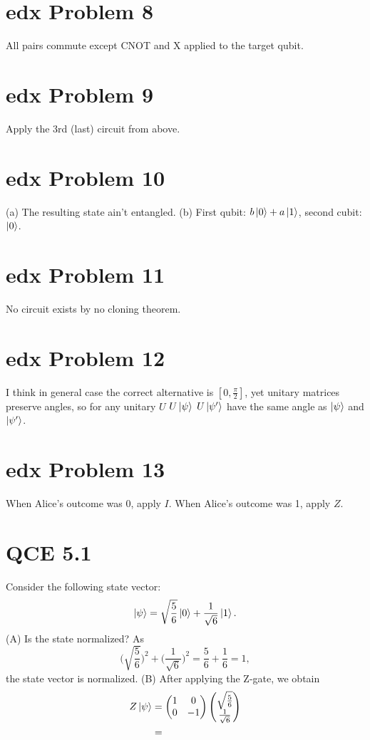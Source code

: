 \documentclass[10pt]{article}
\begin{document}
\section*{edx Problem 8}
All pairs commute except CNOT and X applied to the target qubit.

\section*{edx Problem 9}
Apply the 3rd (last) circuit from above.

\section*{edx Problem 10}
(a) The resulting state ain't entangled.
(b) First qubit: $b\ket{0} + a\ket{1}$, second cubit: $\ket{0}$.

\section*{edx Problem 11}
No circuit exists by no cloning theorem.

\section*{edx Problem 12}
I think in general case the correct alternative is $[0, \frac{\pi}{2}]$, yet unitary matrices preserve angles, so for any unitary $U$ $U\ket{\psi}$ $U\ket{\psi'}$ have the same angle as $\ket{\psi}$ and $\ket{\psi'}$.

\section*{edx Problem 13}
When Alice's outcome was 0, apply $I$. When Alice's outcome was 1, apply $Z$.

\section*{QCE 5.1}
Consider the following state vector:
\[
\ket{\psi} = \sqrt{\frac{5}{6}} \ket{0} + \frac{1}{\sqrt{6}} \ket{1}.
\]
(A) Is the state normalized?
As
\[
\Bigg( \sqrt{\frac{5}{6}} \Bigg)^2 + \Bigg( \frac{1}{\sqrt{6}} \Bigg)^2 = \frac{5}{6} + \frac{1}{6} = 1, 
\]
the state vector is normalized.
(B) After applying the Z-gate, we obtain
\begin{align*}
Z\ket{\psi} &= 
\begin{pmatrix}
1 & 0 \\
0 & -1
\end{pmatrix}
\begin{pmatrix}
\sqrt{\frac{5}{6}} \\
\frac{1}{\sqrt{6}}
\end{pmatrix} \\
&= 
\end{align*}
\end{document}
